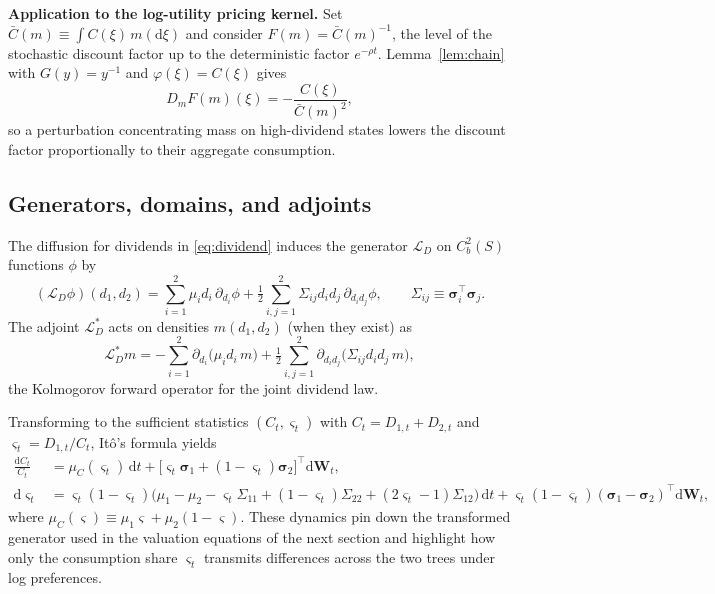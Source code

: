 ﻿\documentclass[11pt,letterpaper,oneside]{article}
\numberwithin{equation}{section}
\newcommand{\1}{\mathbf{1}}
\newcommand{\diff}{\mathrm{d}}
\newcommand{\Dm}{D_m}
\begin{document}
\begin{tcolorbox}[mathstyle]
\textbf{Application to the log-utility pricing kernel.} Set $\bar C(m)\equiv\int C(\xi)\,m(\diff\xi)$ and consider $F(m)=\bar C(m)^{-1}$, the level of the stochastic discount factor up to the deterministic factor $e^{-\rho t}$. Lemma~\ref{lem:chain} with $G(y)=y^{-1}$ and $\varphi(\xi)=C(\xi)$ gives
\[
  \Dm F(m)(\xi) = -\frac{C(\xi)}{\bar C(m)^2},
\]
so a perturbation concentrating mass on high-dividend states lowers the discount factor proportionally to their aggregate consumption.
\end{tcolorbox}

\subsection{Generators, domains, and adjoints}
The diffusion for dividends in \cref{eq:dividend} induces the generator $\mathcal L_D$ on $C_b^2(S)$ functions $\phi$ by
\[
  (\mathcal L_D\phi)(d_1,d_2)
  = \sum_{i=1}^2 \mu_i d_i\,\partial_{d_i}\phi
    + \tfrac12 \sum_{i,j=1}^2 \Sigma_{ij} d_i d_j\,\partial_{d_i d_j}\phi,
  \qquad \Sigma_{ij}\equiv\bm\sigma_i^\top\bm\sigma_j.
\]
The adjoint $\mathcal L_D^{\!*}$ acts on densities $m(d_1,d_2)$ (when they exist) as
\[
  \mathcal L_D^{\!*} m
  = -\sum_{i=1}^2 \partial_{d_i}\big(\mu_i d_i\,m\big)
    + \tfrac12 \sum_{i,j=1}^2 \partial_{d_i d_j}\big(\Sigma_{ij} d_i d_j\,m\big),
\]
the Kolmogorov forward operator for the joint dividend law.

Transforming to the sufficient statistics $(C_t,\varsigma_t)$ with $C_t=D_{1,t}+D_{2,t}$ and $\varsigma_t=D_{1,t}/C_t$, It\^o's formula yields
\begin{align}
  \frac{\diff C_t}{C_t}
  &= \mu_C(\varsigma_t)\,\diff t
     + \big[\varsigma_t\bm\sigma_1 + (1-\varsigma_t)\bm\sigma_2\big]^\top \diff\bm W_t,
  \label{eq:C_drift}\\
  \diff \varsigma_t
  &= \varsigma_t(1-\varsigma_t)\Big(
       \mu_1 - \mu_2
       - \varsigma_t\Sigma_{11}
       + (1-\varsigma_t)\Sigma_{22}
       + (2\varsigma_t-1)\Sigma_{12}
     \Big)\,\diff t
     + \varsigma_t(1-\varsigma_t)(\bm\sigma_1-\bm\sigma_2)^\top \diff\bm W_t,
  \label{eq:s_drift}
\end{align}
where $\mu_C(\varsigma)\equiv \mu_1\varsigma+\mu_2(1-\varsigma)$. These dynamics pin down the transformed generator used in the valuation equations of the next section and highlight how only the consumption share $\varsigma_t$ transmits differences across the two trees under log preferences.
\end{document}
